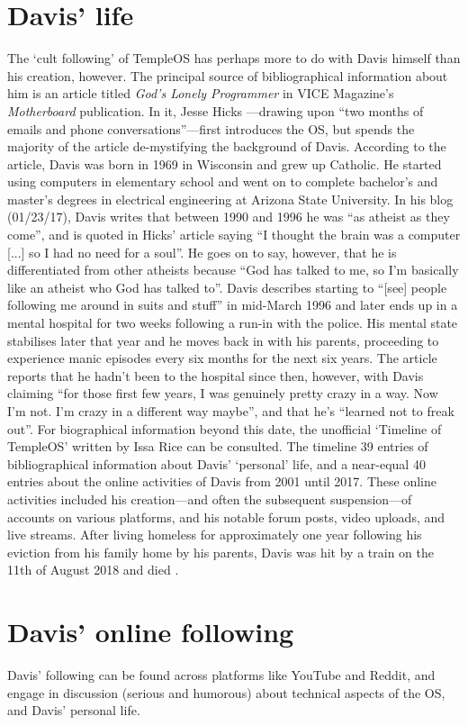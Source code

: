 \documentclass[Draft.tex]{subfiles}
\begin{document}
\section*{Davis' life}
The `cult following' of TempleOS has perhaps
more to do with Davis himself than his creation, however.
The principal source of bibliographical information about him is
an article titled \textit{God’s Lonely Programmer}
in VICE Magazine’s \textit{Motherboard} publication.
In it, Jesse Hicks \parencite*{Hicks14}---drawing
upon ``two months of emails and phone conversations''---first
introduces the OS,
but spends the majority of the article de-mystifying the background of Davis.
According to the article,
Davis was born in 1969 in Wisconsin and grew up Catholic.
He started using computers in elementary school
and went on to complete bachelor's and master's degrees
in electrical engineering at Arizona State University.
In his blog (01/23/17), Davis writes that
between 1990 and 1996 he was ``as atheist as they come'',
and is quoted in Hicks' article saying
``I thought the brain was a computer [...] so I had no need for a soul''.
He goes on to say, however, that he is differentiated from other atheists
because ``God has talked to me,
so I'm basically like an atheist who God has talked to''.
Davis describes starting to
``[see] people following me around in suits and stuff'' in mid-March 1996
and later ends up in a mental hospital for two weeks
following a run-in with the police.
His mental state stabilises later that year
and he moves back in with his parents,
proceeding to experience manic episodes every six months for the next six years.
The article reports that he hadn't been to the hospital since then, however,
with Davis claiming
``for those first few years, I was genuinely pretty crazy in a way.
Now I'm not. I'm crazy in a different way maybe'',
and that he's ``learned not to freak out''.
For biographical information beyond this date,
the unofficial `Timeline of TempleOS' written by Issa Rice
\parencite*{Rice18} can be consulted.
The timeline 39 entries of bibliographical information
about Davis' `personal' life, and a near-equal 40 entries about
the online activities of Davis from 2001 until 2017.
These online activities included his creation---and
often the subsequent suspension---of accounts on various platforms,
and his notable forum posts, video uploads, and live streams.
After living homeless for approximately one year following
his eviction from his family home by his parents,
Davis was hit by a train on the 11th of August 2018 and died \parencite{Cecil18}.


\section*{Davis' online following}
Davis' following can be found across platforms like YouTube and Reddit,
and engage in discussion (serious and humorous) about
technical aspects of the OS, and Davis’ personal life.
\end{document}
